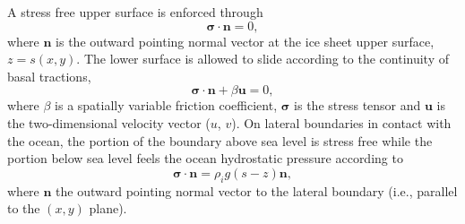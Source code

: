 \documentclass[review,oneside]{igs}
\begin{document}
A stress free upper surface is enforced through 
\begin{equation} \label{eq:stressFreeBC}
\boldsymbol{\sigma} \cdot \mathbf{n} = 0, 
\end{equation}
where $\mathbf{n}$ is the outward pointing normal vector at the ice sheet upper surface, $z=s(x,y)$.
The lower surface is allowed to slide according to the continuity of basal tractions,
\begin{equation} \label{eq:basalbc}
\boldsymbol{\sigma} \cdot \mathbf{n} + \beta \boldsymbol{u} = 0,
\end{equation}
where $\beta$ is a spatially variable friction coefficient, $\boldsymbol{\sigma}$ is the stress tensor and $\boldsymbol{u}$ is the two-dimensional velocity vector ($u$, $v$). On lateral boundaries in contact with the ocean, the portion of the boundary above sea level is stress free while the portion below sea level feels the ocean hydrostatic pressure according to
\begin{equation}\label{eq:oceanbc}
\boldsymbol{\sigma} \cdot \mathbf{n} = \rho_i g (s-z)\mathbf{n},
\end{equation}
where $\mathbf{n}$ the outward pointing normal vector to the lateral boundary (i.e., parallel to the $(x,y)$ plane).
\end{document}
